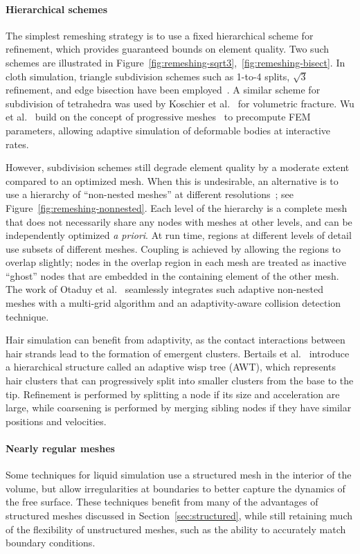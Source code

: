 \paragraph*{Hierarchical schemes} The simplest remeshing strategy is to use a fixed hierarchical scheme for refinement, which provides guaranteed bounds on element quality.
Two such schemes are illustrated in Figure~\ref{fig:remeshing-sqrt3},~\ref{fig:remeshing-bisect}.
In cloth simulation, triangle subdivision schemes such as 1-to-4 splits, $\sqrt3$ refinement, and edge bisection have been employed~\cite{Li2005,Simnett2009,Bender2012:adaptiveFEM}.
A similar scheme for subdivision of tetrahedra was used by Koschier et al.~\cite{Koschier2014} for volumetric fracture.
Wu et al.~\cite{Wu2001} build on the concept of progressive meshes~\cite{Hoppe1996} to precompute FEM parameters, allowing adaptive simulation of deformable bodies at interactive rates.

However, subdivision schemes still degrade element quality by a moderate extent compared to an optimized mesh.
When this is undesirable, an alternative is to use a hierarchy of ``non-nested meshes'' at different resolutions~\cite{Debunne2000,Debunne2001}; see Figure~\ref{fig:remeshing-nonnested}.
Each level of the hierarchy is a complete mesh that does not necessarily share any nodes with meshes at other levels, and can be independently optimized \textit{a priori}.
At run time, regions at different levels of detail use subsets of different meshes.
Coupling is achieved by allowing the regions to overlap slightly; nodes in the overlap region in each mesh are treated as inactive ``ghost'' nodes that are embedded in the containing element of the other mesh.
The work of Otaduy et al.~\cite{Otaduy2007} seamlessly integrates such adaptive non-nested meshes with a multi-grid algorithm and an adaptivity-aware collision detection technique.

Hair simulation can benefit from adaptivity, as the contact interactions between hair strands lead to the formation of emergent clusters.
Bertails et al.~\cite{Bertails2003} introduce a hierarchical structure called an adaptive wisp tree (AWT), which represents hair clusters that can progressively split into smaller clusters from the base to the tip.
Refinement is performed by splitting a node if its size and acceleration are large, while coarsening is performed by merging sibling nodes if they have similar positions and velocities.

\paragraph*{Nearly regular meshes}
Some techniques for liquid simulation use a structured mesh in the interior of the volume, but allow irregularities at boundaries to better capture the dynamics of the free surface.
These techniques benefit from many of the advantages of structured meshes discussed in Section~\ref{sec:structured}, while still retaining much of the flexibility of unstructured meshes, such as the ability to accurately match boundary conditions.

